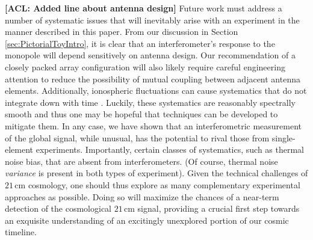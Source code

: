 \documentclass[twocolumn,apj,numberedappendix]{emulateapj}
\newcommand{\acl}[1]{{\color{red} \textbf{[ACL:  #1]}}}
\begin{document}
\acl{Added line about antenna design} Future work must address a number of systematic issues that will inevitably arise with an experiment in the manner described in this paper. From our discussion in Section \ref{sec:PictorialToyIntro}, it is clear that an interferometer's response to the monopole will depend sensitively on antenna design. Our recommendation of a closely packed array configuration will also likely require careful engineering attention to reduce the possibility of mutual coupling between adjacent antenna elements. Additionally, ionospheric fluctuations can cause systematics that do not integrate down with time \citep{DattaIonosphere}. Luckily, these systematics are reasonably spectrally smooth and thus one may be hopeful that techniques can be developed to mitigate them. In any case, we have shown that an interferometric measurement of the global signal, while unusual, has the potential to rival those from single-element experiments. Importantly, certain classes of systematics, such as thermal noise bias, that are absent from interferometers. (Of course, thermal noise \emph{variance} is present in both types of experiment). Given the technical challenges of $21\,\textrm{cm}$ cosmology, one should thus explore as many complementary experimental approaches as possible. Doing so will maximize the chances of a near-term detection of the cosmological $21\,\textrm{cm}$ signal, providing a crucial first step towards an exquisite understanding of an excitingly unexplored portion of our cosmic timeline.
\end{document}
